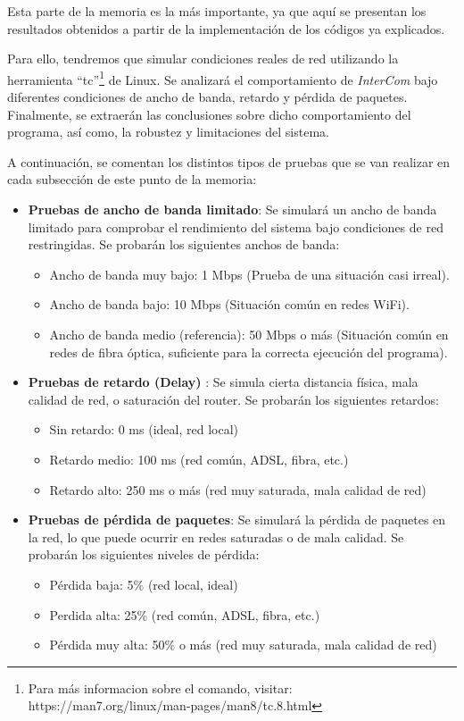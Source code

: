 \label{sec:resultados_y_discusion}

Esta parte de la memoria es la más importante, ya que aquí se presentan los resultados obtenidos a partir de la implementación de los códigos ya explicados. 
\vspace{\baselineskip}

Para ello, tendremos que simular condiciones reales de red utilizando la herramienta ``tc''\footnote{Para más informacion sobre el comando, visitar: https://man7.org/linux/man-pages/man8/tc.8.html} de Linux. Se analizará el comportamiento de \textit{InterCom} bajo diferentes condiciones de ancho de banda, retardo y pérdida de paquetes. Finalmente, se extraerán las conclusiones sobre dicho comportamiento del programa, así como, la robustez y limitaciones del sistema.
\vspace{\baselineskip}

A continuación, se comentan los distintos tipos de pruebas que se van realizar en cada subsección de este punto de la memoria:
\begin{itemize}
    \item \textbf{Pruebas de ancho de banda limitado}: Se simulará un ancho de banda limitado para comprobar el rendimiento del sistema bajo condiciones de red restringidas. Se probarán los siguientes anchos de banda:
    \begin{itemize}
        \item Ancho de banda muy bajo: 1 Mbps (Prueba de una situación casi irreal).
        \item Ancho de banda bajo: 10 Mbps (Situación común en redes WiFi).
        \item Ancho de banda medio (referencia): 50 Mbps o más (Situación común en redes de fibra óptica, suficiente para la correcta ejecución del programa).
    \end{itemize}
    \item \textbf{Pruebas de retardo (Delay)} : Se simula cierta distancia física, mala calidad de red, o saturación del router. Se probarán los siguientes retardos:
    \begin{itemize}
        \item Sin retardo: 0 ms (ideal, red local)
        \item Retardo medio: 100 ms (red común, ADSL, fibra, etc.)
        \item Retardo alto: 250 ms o más (red muy saturada, mala calidad de red)
    \end{itemize}
    \item \textbf{Pruebas de pérdida de paquetes}: Se simulará la pérdida de paquetes en la red, lo que puede ocurrir en redes saturadas o de mala calidad. Se probarán los siguientes niveles de pérdida: 
    \begin{itemize}
        \item Pérdida baja: 5\% (red local, ideal)
        \item Perdida alta: 25\% (red común, ADSL, fibra, etc.)
        \item Pérdida muy alta: 50\% o más (red muy saturada, mala calidad de red)
    \end{itemize}
\end{itemize}

